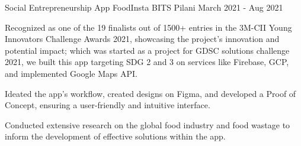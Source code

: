 

\begin{cventries}

  \cventry
    {Social Entrepreneurship App} %
    {FoodInsta} %
    {BITS Pilani} %
    {March 2021 - Aug 2021} %
    {
      \begin{cvitems} %
        \item {Recognized as one of the 19 finalists out of 1500+ entries in the 3M-CII Young Innovators Challenge Awards 2021, showcasing the project's innovation and potential impact; which was started as a project for GDSC solutions challenge 2021, we built this app targeting SDG 2 and 3 on services like Firebase, GCP, and implemented Google Maps API. }
        \item {Ideated the app's workflow, created designs on Figma, and developed a Proof of Concept, ensuring a user-friendly and intuitive interface.}
        \item {Conducted extensive research on the global food industry and food wastage to inform the development of effective solutions within the app.}
      \end{cvitems}
    }




\end{cventries}
